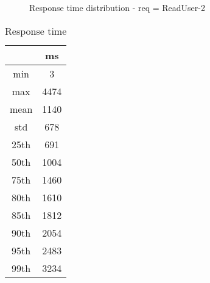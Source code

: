\begin{minipage}{0.75\linewidth}
\begin{figure}[h]
\begin{adjustbox}{max width=1.0\linewidth, keepaspectratio}
  \end{adjustbox}
  \caption{Response time distribution - req = ReadUser-2}
\end{figure}
\end{minipage}\hfill\begin{minipage}{0.18\linewidth}
\begin{table}[h]
\begin{tabular}{|cc|}
\hline
\textbf{} & \textbf{ms}\\ \hline
 \Xhline{0.005\arrayrulewidth}
min & 3\\
 \Xhline{0.005\arrayrulewidth}
max & 4474\\
 \Xhline{0.005\arrayrulewidth}
mean & 1140\\
 \Xhline{0.005\arrayrulewidth}
std & 678\\
\hline
\hline
 \Xhline{0.005\arrayrulewidth}
25th & 691\\
 \Xhline{0.005\arrayrulewidth}
50th & 1004\\
 \Xhline{0.005\arrayrulewidth}
75th & 1460\\
 \Xhline{0.005\arrayrulewidth}
80th & 1610\\
 \Xhline{0.005\arrayrulewidth}
85th & 1812\\
 \Xhline{0.005\arrayrulewidth}
90th & 2054\\
 \Xhline{0.005\arrayrulewidth}
95th & 2483\\
 \Xhline{0.005\arrayrulewidth}
99th & 3234\\
\hline
\end{tabular}
\caption{Response time}
\end{table}
\end{minipage}\hfill